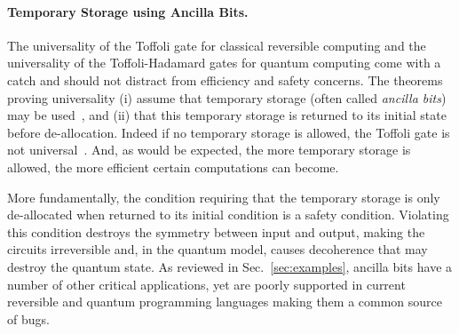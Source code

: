 \documentclass[sigplan,10pt,review,anonymous]{acmart}
\begin{document}
\paragraph*{Temporary Storage using Ancilla Bits.} The universality of
the Toffoli gate for classical reversible computing and the
universality of the Toffoli-Hadamard gates for quantum computing come
with a catch and should
not distract from efficiency and safety concerns. The theorems proving
universality (i) assume that temporary storage (often called
\emph{ancilla bits}) may be used~\cite{Toffoli:1980}, and (ii) that
this temporary storage is returned to its initial state before
de-allocation. Indeed if no temporary storage is allowed, the Toffoli
gate is not
universal~\cite{aaronson_et_al:LIPIcs:2017:8173,DBLP:journals/corr/Xu15e}.
And, as would be expected, the more temporary storage is allowed, the
more efficient certain computations can become.

More fundamentally, the condition requiring that the temporary storage
is only de-allocated when returned to its initial condition is a
safety condition. Violating this condition destroys the symmetry
between input and output, making the circuits irreversible and, in
the quantum model, causes decoherence that may destroy the quantum
state. As reviewed in Sec.~\ref{sec:examples}, ancilla bits have a
number of other critical applications, yet are poorly supported in
current reversible and quantum programming languages making them a
common source of bugs.
\end{document}
